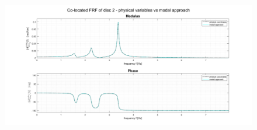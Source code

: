 \documentclass[a4paper,12pt,oneside]{article}
\begin{document}
\vspace{30pt}

\begin{figure}[h]
	\hspace{-70pt}
	\includegraphics[scale=0.4]{co-located_disc2_physical_vs_modal}
\end{figure}
\end{document}
